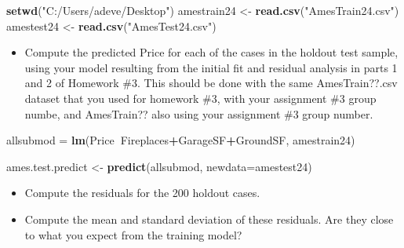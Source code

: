 \documentclass[
]{article}
\newenvironment{Shaded}{\begin{snugshade}}{\end{snugshade}}
\newcommand{\DataTypeTok}[1]{\textcolor[rgb]{0.13,0.29,0.53}{#1}}
\newcommand{\KeywordTok}[1]{\textcolor[rgb]{0.13,0.29,0.53}{\textbf{#1}}}
\newcommand{\NormalTok}[1]{#1}
\newcommand{\OperatorTok}[1]{\textcolor[rgb]{0.81,0.36,0.00}{\textbf{#1}}}
\newcommand{\StringTok}[1]{\textcolor[rgb]{0.31,0.60,0.02}{#1}}
\providecommand{\tightlist}{%
  \setlength{\itemsep}{0pt}\setlength{\parskip}{0pt}}
\begin{document}
\begin{Shaded}
\begin{Highlighting}[]
\KeywordTok{setwd}\NormalTok{(}\StringTok{"C:/Users/adeve/Desktop"}\NormalTok{)}
\NormalTok{amestrain24 <-}\StringTok{ }\KeywordTok{read.csv}\NormalTok{(}\StringTok{"AmesTrain24.csv"}\NormalTok{)}
\NormalTok{amestest24 <-}\StringTok{ }\KeywordTok{read.csv}\NormalTok{(}\StringTok{"AmesTest24.csv"}\NormalTok{)}
\end{Highlighting}
\end{Shaded}

\begin{itemize}
\tightlist
\item
  Compute the predicted Price for each of the cases in the holdout test
  sample, using your model resulting from the initial fit and residual
  analysis in parts 1 and 2 of Homework \#3. This should be done with
  the same AmesTrain??.csv dataset that you used for homework \#3, with
  your assignment \#3 group numbe, and AmesTrain?? also using your
  assignment \#3 group number.
\end{itemize}

\begin{Shaded}
\begin{Highlighting}[]
\NormalTok{allsubmod =}\StringTok{ }\KeywordTok{lm}\NormalTok{(Price}\OperatorTok{~}\NormalTok{Fireplaces}\OperatorTok{+}\NormalTok{GarageSF}\OperatorTok{+}\NormalTok{GroundSF, amestrain24)}

\NormalTok{ames.test.predict <-}\StringTok{ }\KeywordTok{predict}\NormalTok{(allsubmod, }\DataTypeTok{newdata=}\NormalTok{amestest24)}
\end{Highlighting}
\end{Shaded}

\begin{itemize}
\tightlist
\item
  Compute the residuals for the 200 holdout cases.
\end{itemize}

\begin{Shaded}
\end{Shaded}

\begin{itemize}
\tightlist
\item
  Compute the mean and standard deviation of these residuals. Are they
  close to what you expect from the training model?
\end{itemize}
\end{document}
